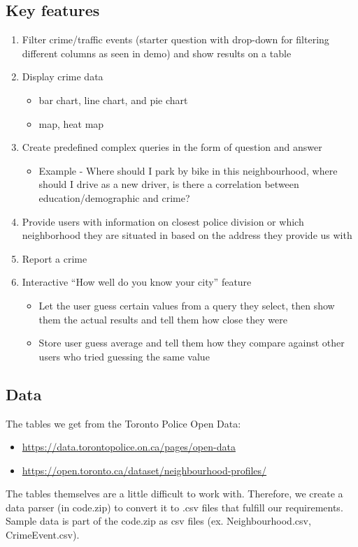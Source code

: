 \documentclass[12pt, a4paper]{article}
\begin{document}
\subsection*{Key features}
\begin{enumerate}
\item Filter crime/traffic events (starter question with drop-down for filtering different columns as seen in demo) and show results on a table
\item Display crime data
\begin{itemize}
\item bar chart, line chart, and pie chart
\item map, heat map
\end{itemize}
\item Create predefined complex queries in the form of question and answer
\begin{itemize}
    \item Example - Where should I park by bike in this neighbourhood, where should I drive as a new driver, is there a correlation between education/demographic and crime?
\end{itemize}
\item Provide users with information on closest police division or which neighborhood they are situated in based on the address they provide us with
\item Report a crime
\item Interactive “How well do you know your city” feature
\begin{itemize}
    \item Let the user guess certain values from a query they select, then show them the actual results and tell them how close they were
    \item Store user guess average and tell them how they compare against other users who tried guessing the same value
\end{itemize}
\end{enumerate}
\subsection*{Data}
The tables we get from the Toronto Police Open Data:
\begin{itemize}
    \item \url{https://data.torontopolice.on.ca/pages/open-data}
    \item \url{https://open.toronto.ca/dataset/neighbourhood-profiles/}
\end{itemize}
The tables themselves are a little difficult to work with. Therefore, we create a data parser (in code.zip) to convert it to .csv files that fulfill our requirements. Sample data is part of the code.zip as csv files (ex. Neighbourhood.csv, CrimeEvent.csv).
\end{document}
